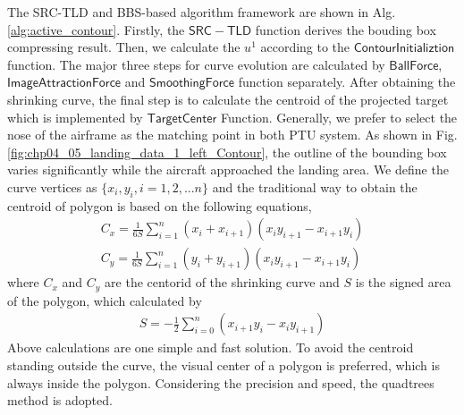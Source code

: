The SRC-TLD and BBS-based algorithm framework are shown in Alg.\ref{alg:active_contour}. Firstly, the $\mathsf{SRC-TLD}$ function derives the bouding box compressing result. Then, we calculate the $u^1$ according to the $\mathsf{ContourInitializtion}$ function. The major three steps for curve evolution are calculated by $\mathsf{BallForce}$, $\mathsf{ImageAttractionForce}$ and $\mathsf{SmoothingForce}$ function separately. After obtaining the shrinking curve, the final step is to calculate the centroid of the projected target which is implemented by $\mathsf{TargetCenter}$ Function. Generally, we prefer to select the nose of the airframe as the matching point in both PTU system. As shown in Fig. \ref{fig:chp04_05_landing_data_1_left_Contour}, the outline of the bounding box varies significantly while the aircraft approached the landing area. We define the curve vertices as $\{x_i, y_i, i=1, 2, ... n\}$ and the traditional way to obtain the centroid of polygon is based on the following equations,
\begin{align}
C_x = \frac{1}{6S}\sum_{i=1}^{n}(x_i+x_{i+1})(x_iy_{i+1}-x_{i+1}y_i) \\
C_y = \frac{1}{6S}\sum_{i=1}^{n}(y_i+y_{i+1})(x_iy_{i+1}-x_{i+1}y_i)
\end{align}
where $C_x$ and $C_y$ are the centorid of the shrinking curve and $S$ is the signed area of the polygon, which calculated by
\begin{align}
S=-\frac{1}{2}\sum_{i=0}^{n}(x_{i+1}y_i-x_iy_{i+1})
\end{align}
Above calculations are one simple and fast solution. To avoid the centroid standing outside the curve, the visual center of a polygon is preferred, which is always inside the polygon. Considering the precision and speed, the quadtrees method is adopted.

